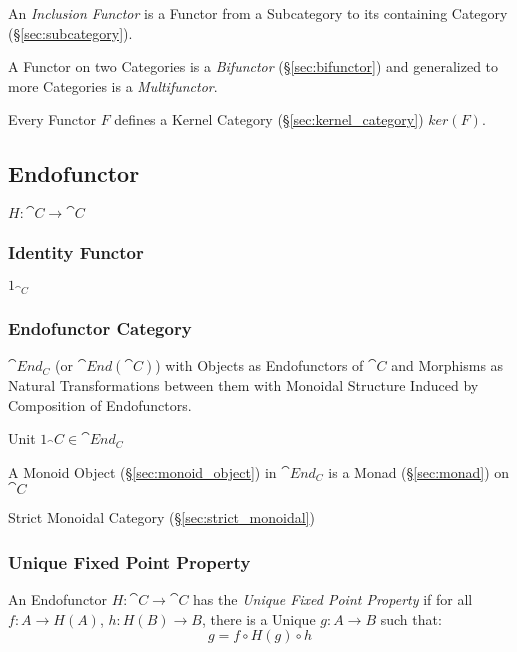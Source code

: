 An \emph{Inclusion Functor} is a Functor from a Subcategory to its
containing Category (\S\ref{sec:subcategory}).

A Functor on two Categories is a \emph{Bifunctor}
(\S\ref{sec:bifunctor}) and generalized to more Categories is a
\emph{Multifunctor}.

Every Functor $F$ defines a Kernel Category
(\S\ref{sec:kernel_category}) $ker(F)$.



\subsection{Endofunctor}\label{sec:endofunctor}

$H : \cat{C} \rightarrow \cat{C}$



\subsubsection{Identity Functor}\label{sec:identity_functor}

$1_{\cat{C}}$



\subsubsection{Endofunctor Category}\label{sec:endofunctor_category}

$\cat{End_C}$ (or $\cat{End}(\cat{C})$) with Objects as
Endofunctors of $\cat{C}$ and Morphisms as Natural Transformations
between them with Monoidal Structure Induced by Composition of
Endofunctors.

Unit $1_\cat{C} \in \cat{End_C}$

A Monoid Object (\S\ref{sec:monoid_object}) in $\cat{End_C}$ is a
Monad (\S\ref{sec:monad}) on $\cat{C}$

Strict Monoidal Category (\S\ref{sec:strict_monoidal})



\subsubsection{Unique Fixed Point Property}\label{sec:ufpp}

An Endofunctor $H : \cat{C} \rightarrow \cat{C}$ has the \emph{Unique
  Fixed Point Property} if for all $f : A \rightarrow H(A)$, $h : H(B)
\rightarrow B$, there is a Unique $g : A \rightarrow B$ such that:
\[
  g = f \circ H(g) \circ h
\]

